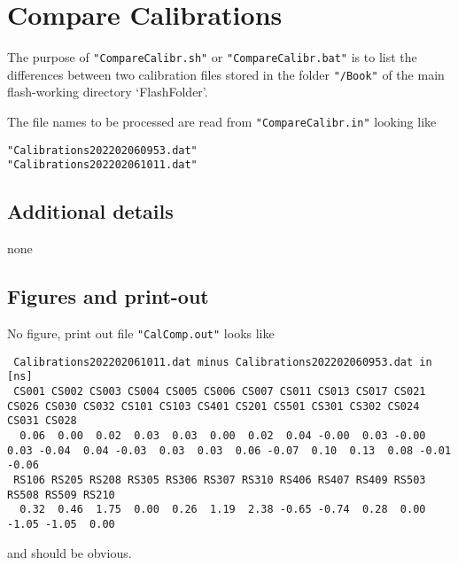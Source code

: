 
\section{Compare Calibrations}

The purpose of \verb!"CompareCalibr.sh"! or  \verb!"CompareCalibr.bat"! is to list the differences between two calibration files stored in the folder \verb!"/Book"! of the main flash-working directory `FlashFolder'.

The file names to be processed are read from  \verb!"CompareCalibr.in"! looking like

\begin{linenumbers}
\resetlinenumber
\begin{verbatim}
"Calibrations202202060953.dat"
"Calibrations202202061011.dat"
\end{verbatim}
\end{linenumbers}

\subsection{Additional details}
none

\subsection{Figures and print-out}%

No figure, print out file \verb!"CalComp.out"! looks like

\begin{linenumbers}
\tiny
\resetlinenumber
\begin{verbatim}
 Calibrations202202061011.dat minus Calibrations202202060953.dat in [ns]
 CS001 CS002 CS003 CS004 CS005 CS006 CS007 CS011 CS013 CS017 CS021 CS026 CS030 CS032 CS101 CS103 CS401 CS201 CS501 CS301 CS302 CS024 CS031 CS028
  0.06  0.00  0.02  0.03  0.03  0.00  0.02  0.04 -0.00  0.03 -0.00  0.03 -0.04  0.04 -0.03  0.03  0.03  0.06 -0.07  0.10  0.13  0.08 -0.01 -0.06
 RS106 RS205 RS208 RS305 RS306 RS307 RS310 RS406 RS407 RS409 RS503 RS508 RS509 RS210
  0.32  0.46  1.75  0.00  0.26  1.19  2.38 -0.65 -0.74  0.28  0.00 -1.05 -1.05  0.00
\end{verbatim}
\end{linenumbers}

and should be obvious.